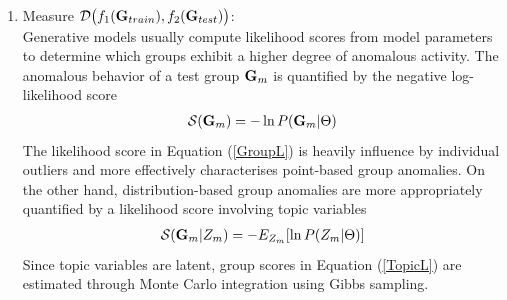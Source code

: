 \begin{enumerate}[3.] 
\item Measure $ \mathcal{D}\big(f_1({\bf G}_{train}), f_2({\bf G}_{test})\big )$: \\
Generative models usually compute likelihood scores  from model parameters to determine which groups exhibit a higher degree of anomalous activity.  
 The anomalous behavior of a test group ${\bf G}_{m}$ is  quantified by the negative log-likelihood score
 \begin{align}
 \mathcal{S} ({\bf G}_{m}) = - \ln P({\bf G}_{m} | \Theta) \label{GroupL}
 \end{align}
 The likelihood score in Equation (\ref{GroupL}) is heavily influence by individual outliers and more effectively characterises point-based group anomalies. On the other hand, distribution-based group anomalies are more appropriately quantified by a likelihood score involving topic variables  
\begin{align}
 \mathcal{S} ({\bf G}_{m}|Z_{m}) = - E_{Z_{m}} [\ln P({Z}_{m} | \Theta) ] 
  \label{TopicL}
\end{align}
Since topic variables are latent,  group scores in Equation  (\ref{TopicL}) are estimated through Monte Carlo integration using Gibbs sampling.  
\end{enumerate}

 

